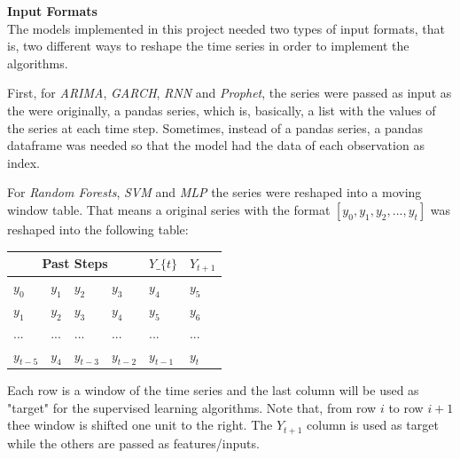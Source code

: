 \documentclass[10pt,twocolumn,letterpaper]{article}
\begin{document}
\textbf{Input Formats}\\

The models implemented in this project needed two types of input formats, that is, two different ways to reshape the time series in order to implement the algorithms.

First, for \textit{ARIMA}, \textit{GARCH}, \textit{RNN} and \textit{Prophet}, the series were passed as input as the were originally, a pandas series, which is, basically, a list with the values of the series at each time step. Sometimes, instead of a pandas series, a pandas dataframe was needed so that the model had the data of each observation as index.

For \textit{Random Forests}, \textit{SVM} and \textit{MLP} the series were reshaped into a moving window table. That means a original series with the format $[y_{0},y_{1},y_{2},...,y_{t}]$ was reshaped into the following table:

\begin{table}[h]
	\centering
	\begin{tabular}{|llll|l|l|}
		\hline
		\multicolumn{4}{|c|}{Past Steps}                                                                            &  $Y\_\{t\}$ & $Y_{t+1}$ \\ \hline
		\multicolumn{1}{|l|}{$y_{0}$}   & \multicolumn{1}{l|}{$y_{1}$} & \multicolumn{1}{l|}{$y_{2}$}   & $y_{3}$   & $y_{4}$                & $y_{5}$                \\ \hline
		\multicolumn{1}{|l|}{$y_{1}$}   & \multicolumn{1}{l|}{$y_{2}$} & \multicolumn{1}{l|}{$y_{3}$}   & $y_{4}$   & $y_{5}$                & $y_{6}$                \\ \hline
		\multicolumn{1}{|l|}{...}       & \multicolumn{1}{l|}{...}     & \multicolumn{1}{l|}{...}       & ...       & ...                    & ...                    \\ \hline
		\multicolumn{1}{|l|}{$y_{t-5}$} & \multicolumn{1}{l|}{$y_{4}$} & \multicolumn{1}{l|}{$y_{t-3}$} & $y_{t-2}$ & $y_{t-1}$              & $y_{t}$                \\ \hline
	\end{tabular}
\end{table}

Each row is a window of the time series and the last column will be used as "target" for the supervised learning algorithms. Note that, from row $i$ to row $i+1$ thee window is shifted one unit to the right. The $Y_{t+1}$ column is used as target while the others are passed as features/inputs.
\end{document}
